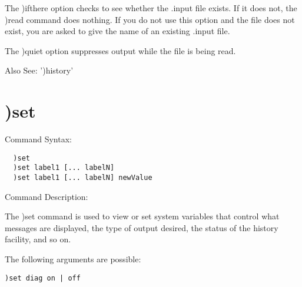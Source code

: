 The )ifthere option checks to see whether the .input file exists. If it does not, the )read command does nothing. If you do not use this option and the file does not exist, you are asked to give the name of an existing .input file.

The )quiet option suppresses output while the file is being read.

Also See: ')history'

\section{)set}

Command Syntax:
\begin{verbatim}
  )set
  )set label1 [... labelN]
  )set label1 [... labelN] newValue
\end{verbatim}
Command Description:

The )set command is used to view or set system variables that control what messages are displayed, the type of output desired, the status of the history facility, and so on.

The following arguments are possible:
\begin{verbatim}
)set diag on | off
\end{verbatim}

